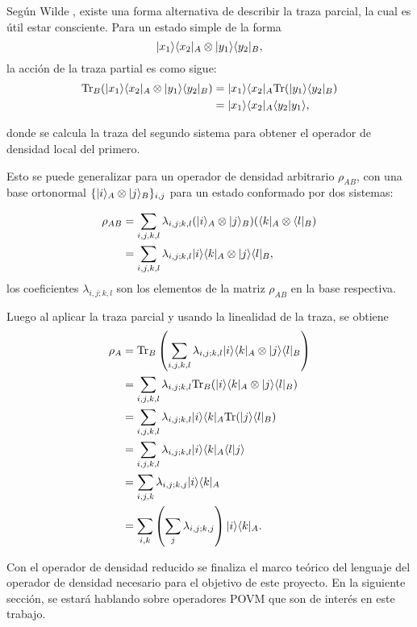 Según Wilde {\cite{wilde2011classical}}, existe una forma alternativa de describir la traza parcial, la cual es útil estar consciente. Para un estado simple de la forma  \begin{equation}
	|x_1\rangle \langle x_2|_A\otimes|y_1\rangle \langle y_2|_B,
\end{equation} la acción de la traza partial es como sigue: \begin{equation}
	\begin{split}
	{\rm Tr}_B(	|x_1\rangle \langle x_2|_A\otimes|y_1\rangle \langle y_2|_B)&=|x_1\rangle \langle x_2|_A{\rm Tr}(|y_1\rangle \langle y_2|_B)\\
	&=|x_1\rangle \langle x_2|_A \langle y_2|y_1\rangle,
	\end{split}
\end{equation}

donde se calcula la traza del segundo sistema para obtener el operador de densidad local del primero.

Esto se puede generalizar para un operador de densidad arbitrario $\rho_{AB}$, con una base ortonormal $\{|i \rangle_A \otimes |j\rangle_B \} _{i,j}$ para un estado conformado por dos sistemas:


\begin{equation}
	\begin{split}
	\rho_{AB}&=\sum_{i,j,k,l}\lambda_{i,j;k,l}(|i\rangle_A \otimes|j\rangle_B)(\langle k|_A\otimes \langle l|_B)\\
	&=\sum_{i,j,k,l}\lambda_{i,j;k,l} |i\rangle \langle k|_A\otimes|j\rangle \langle l|_B,
	\end{split}
\end{equation}
los coeficientes $\lambda_{i,j;k,l}$  son los elementos de la matriz $\rho_{AB}$ en la base respectiva.


Luego al aplicar la traza parcial y usando la linealidad de la traza, se obtiene \begin{equation}
	\begin{split}
		\rho_A&={\rm Tr}_B\left(\sum_{i,j,k,l}\lambda_{i,j;k,l} |i\rangle \langle k|_A\otimes|j\rangle \langle l|_B\right)\\
		&=\sum_{i,j,k,l}\lambda_{i,j;k,l} {\rm Tr}_B(|i\rangle \langle k|_A\otimes|j\rangle \langle l|_B)\\
		&=\sum_{i,j,k,l}\lambda_{i,j;k,l}|i\rangle \langle k|_A {\rm Tr}(|j\rangle \langle l|_B)\\
		&=\sum_{i,j,k,l}\lambda_{i,j;k,l}|i\rangle \langle k|_A \langle l|j\rangle \\
		&=\sum_{i,j,k}\lambda_{i,j;k,j}|i\rangle \langle k|_A\\
		&=\sum_{i,k}\left(\sum_j\lambda_{i,j;k,j}\right)|i\rangle \langle k|_A.
	\end{split}
\end{equation}



Con el operador de densidad reducido se finaliza el marco teórico del lenguaje del operador de densidad necesario para el objetivo de este proyecto. En la siguiente sección, se estará hablando sobre operadores POVM que son de interés en este trabajo.



